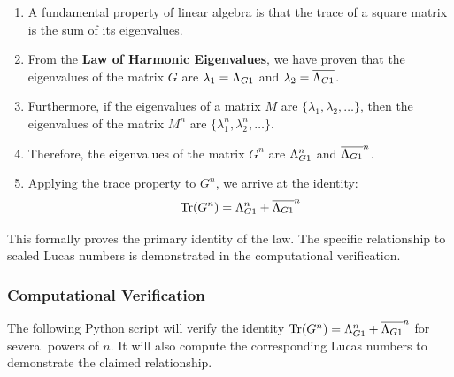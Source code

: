 \begin{enumerate}
    \item A fundamental property of linear algebra is that the trace of a square matrix is the sum of its eigenvalues.
    \item From the \textbf{Law of Harmonic Eigenvalues}, we have proven that the eigenvalues of the matrix $G$ are $\lambda_1 = \Lambda_{G1}$ and $\lambda_2 = \overline{\Lambda_{G1}}$.
    \item Furthermore, if the eigenvalues of a matrix $M$ are $\{\lambda_1, \lambda_2, \dots\}$, then the eigenvalues of the matrix $M^n$ are $\{\lambda_1^n, \lambda_2^n, \dots\}$.
    \item Therefore, the eigenvalues of the matrix $G^n$ are $\Lambda_{G1}^n$ and $\overline{\Lambda_{G1}}^n$.
    \item Applying the trace property to $G^n$, we arrive at the identity:
    $$ \text{Tr}(G^n) = \Lambda_{G1}^n + \overline{\Lambda_{G1}}^n $$
\end{enumerate}
This formally proves the primary identity of the law. The specific relationship to scaled Lucas numbers is demonstrated in the computational verification.

\subsubsection*{Computational Verification}
The following Python script will verify the identity $\text{Tr}(G^n) = \Lambda_{G1}^n + \overline{\Lambda_{G1}}^n$ for several powers of $n$. It will also compute the corresponding Lucas numbers to demonstrate the claimed relationship.

